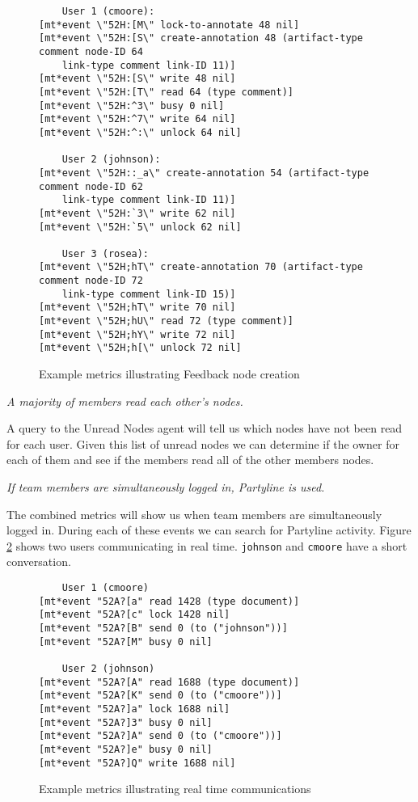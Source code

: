 \begin{itemizenoindent}
\begin{figure}[htb]
  \small
  \begin{verbatim}
    User 1 (cmoore):
[mt*event \"52H:[M\" lock-to-annotate 48 nil]
[mt*event \"52H:[S\" create-annotation 48 (artifact-type comment node-ID 64
    link-type comment link-ID 11)] 
[mt*event \"52H:[S\" write 48 nil]
[mt*event \"52H:[T\" read 64 (type comment)]
[mt*event \"52H:^3\" busy 0 nil]
[mt*event \"52H:^7\" write 64 nil]
[mt*event \"52H:^:\" unlock 64 nil]

    User 2 (johnson):
[mt*event \"52H::_a\" create-annotation 54 (artifact-type comment node-ID 62
    link-type comment link-ID 11)]
[mt*event \"52H:`3\" write 62 nil]
[mt*event \"52H:`5\" unlock 62 nil] 

    User 3 (rosea):
[mt*event \"52H;hT\" create-annotation 70 (artifact-type comment node-ID 72
    link-type comment link-ID 15)]
[mt*event \"52H;hT\" write 70 nil]
[mt*event \"52H;hU\" read 72 (type comment)]
[mt*event \"52H;hY\" write 72 nil]
[mt*event \"52H;h[\" unlock 72 nil]
  \end{verbatim}
  \normalsize
  \caption{Example metrics illustrating Feedback node creation}
  \label{fig:feedback}
\end{figure}


\item{\em A majority of members read each other's nodes.}

  A query to the Unread Nodes agent will tell us which nodes have not been
  read for each user.  Given this list of unread nodes we can determine if
  the owner for each of them and see if the members read all of the other
  members nodes.

\item{\em If team members are simultaneously logged in, Partyline is used.}

  The combined metrics will show us when team members are simultaneously
  logged in.  During each of these events we can search for Partyline
  activity.  Figure \ref{example:realTime} shows two users communicating in
  real time. {\tt johnson} and {\tt cmoore} have a short conversation.

  \begin{figure}[htb]
    \small
    \begin{verbatim}
    User 1 (cmoore)
[mt*event "52A?[a" read 1428 (type document)]
[mt*event "52A?[c" lock 1428 nil]
[mt*event "52A?[B" send 0 (to ("johnson"))]
[mt*event "52A?[M" busy 0 nil]

    User 2 (johnson)
[mt*event "52A?[A" read 1688 (type document)]
[mt*event "52A?[K" send 0 (to ("cmoore"))]
[mt*event "52A?]a" lock 1688 nil]
[mt*event "52A?]3" busy 0 nil]
[mt*event "52A?]A" send 0 (to ("cmoore"))]
[mt*event "52A?]e" busy 0 nil]
[mt*event "52A?]Q" write 1688 nil]
    \end{verbatim}
    \normalsize
    \caption{Example metrics illustrating real time communications}
    \label{example:realTime}
  \end{figure}



\end{itemizenoindent}

